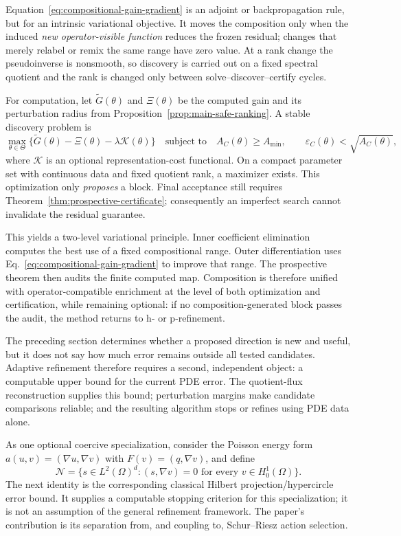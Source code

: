 \documentclass[11pt]{article}
\numberwithin{algorithm}{section}
\theoremstyle{definition}\newtheorem{definition}[theorem]{Definition}
\theoremstyle{remark}\newtheorem{remark}[theorem]{Remark}
\begin{document}
Equation~\eqref{eq:compositional-gain-gradient} is an adjoint or
backpropagation rule, but for an intrinsic variational objective.  It moves
the composition only when the induced \emph{new operator-visible function}
reduces the frozen residual; changes that merely relabel or remix the same
range have zero value.  At a rank change the pseudoinverse is nonsmooth, so
discovery is carried out on a fixed spectral quotient and the rank is changed
only between solve--discover--certify cycles.

For computation, let $\widetilde G(\theta)$ and $\Xi(\theta)$ be the computed
gain and its perturbation radius from
Proposition~\ref{prop:main-safe-ranking}.  A stable discovery problem is
\begin{equation}
 \max_{\theta\in\Theta}
 \bigl\{\widetilde G(\theta)-\Xi(\theta)
       -\lambda\mathcal K(\theta)\bigr\}
 \quad\text{subject to}\quad
 A_C(\theta)\geq A_{\min},\qquad
 \varepsilon_C(\theta)<\sqrt{A_C(\theta)},
 \label{eq:certified-compositional-discovery}
\end{equation}
where $\mathcal K$ is an optional representation-cost functional.  On a
compact parameter set with continuous data and fixed quotient rank, a
maximizer exists.  This optimization only \emph{proposes} a block.  Final
acceptance still requires
Theorem~\ref{thm:prospective-certificate}; consequently an imperfect
search cannot invalidate the residual guarantee.

This yields a two-level variational principle.  Inner coefficient elimination
computes the best use of a fixed compositional range.  Outer differentiation
uses Eq.~\eqref{eq:compositional-gain-gradient} to improve that range.  The
prospective theorem then audits the finite computed map.  Composition is
therefore unified with operator-compatible enrichment at the level of both
optimization and certification, while remaining optional: if no
composition-generated block passes the audit, the method returns to h- or
p-refinement.

The preceding section determines whether a proposed direction is new and useful, but it
does not say how much error remains outside all tested candidates.  Adaptive
refinement therefore requires a second, independent object: a computable upper
bound for the current PDE error.  The quotient-flux reconstruction supplies
this bound; perturbation margins make candidate comparisons reliable; and the
resulting algorithm stops or refines using PDE data alone.

As one optional coercive specialization, consider the Poisson energy form
$a(u,v)=(\nabla u,\nabla v)$ with $F(v)=(q,\nabla v)$, and define
\[
 \mathcal N=\{s\in L^2(\Omega)^d:(s,\nabla v)=0
 \text{ for every }v\in H_0^1(\Omega)\}.
\]
The next identity is the corresponding classical Hilbert
projection/hypercircle error bound.  It supplies a computable stopping criterion for this
specialization; it is not an assumption of the general refinement framework.
The paper's contribution is its separation from, and coupling to,
Schur--Riesz action selection.
\end{document}
